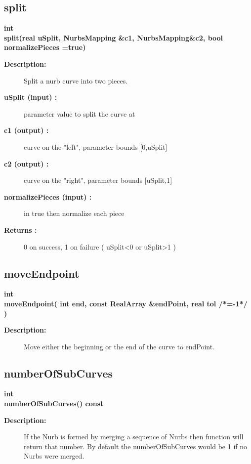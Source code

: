 \subsection{split}
 
\begin{flushleft} \textbf{%
int  \\ 
\settowidth{\NurbsMappingIncludeArgIndent}{split(}%
split(real uSplit, NurbsMapping \&c1, NurbsMapping\&c2, bool normalizePieces  =true)
}\end{flushleft}
\begin{description}
\item[{\bf Description:}] 
  Split a nurb curve into two pieces.
\item[{\bf uSplit (input) :}]  parameter value to split the curve at
\item[{\bf c1 (output) :}]  curve on the "left", parameter bounds [0,uSplit]
\item[{\bf c2 (output) :}]  curve on the "right", parameter bounds [uSplit,1]
\item[{\bf normalizePieces (input) :}]  in true then normalize each piece
\item[{\bf Returns :}]  0 on success, 1 on failure ( uSplit<0 or uSplit>1 )
\end{description}
\subsection{moveEndpoint}
 
\begin{flushleft} \textbf{%
int  \\ 
\settowidth{\NurbsMappingIncludeArgIndent}{moveEndpoint(}%
moveEndpoint( int end, const RealArray \&endPoint, real tol /*=-1*/ )
}\end{flushleft}
\begin{description}
\item[{\bf Description:}] 
  Move either the beginning or the end of the curve to endPoint.
\end{description}
\subsection{numberOfSubCurves}
 
\begin{flushleft} \textbf{%
int  \\ 
\settowidth{\NurbsMappingIncludeArgIndent}{numberOfSubCurves(}%
numberOfSubCurves() const
}\end{flushleft}
\begin{description}
\item[{\bf Description:}] 
  If the Nurb is formed by merging a sequence of Nurbs then function will return that number.
  By default the numberOfSubCurves would be 1 if no Nurbs were merged.
\end{description}
